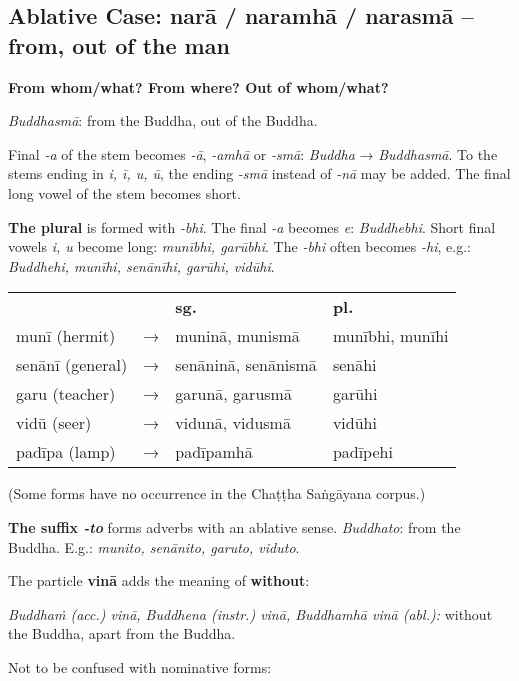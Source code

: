 \documentclass[11pt,oneside]{memoir}
\begin{document}
\normalArrayStrech

\clearpage

\subsection{Ablative Case: narā / naramhā / narasmā -- from, out of the man}
\label{sec:orgd379838}

\textbf{From whom/what? From where? Out of whom/what?}

\emph{Buddhasmā}: from the Buddha, out of the Buddha.

Final \emph{-a} of the stem becomes \emph{-ā}, \emph{-amhā} or \emph{-smā}: \emph{Buddha} → \emph{Buddhasmā}.
To the stems ending in \emph{i, ī, u, ū}, the ending \emph{-smā} instead of \emph{-nā} may be
added. The final long vowel of the stem becomes short.

\textbf{The plural} is formed with \emph{-bhi}. The final \emph{-a} becomes \emph{e}: \emph{Buddhebhi}.
Short final vowels \emph{i, u} become long: \emph{munībhi, garūbhi}. The \emph{-bhi} often
becomes \emph{-hi}, e.g.: \emph{Buddhehi, munīhi, senānīhi, garūhi, vidūhi}.

\begin{center}
\begin{tabular}{llll}
 &  & \textbf{sg.} & \textbf{pl.}\\[0pt]
munī (hermit) & → & muninā, munismā & munībhi, munīhi\\[0pt]
senānī (general) & → & senāninā, senānismā & senāhi\\[0pt]
garu (teacher) & → & garunā,  garusmā & garūhi\\[0pt]
vidū (seer) & → & vidunā, vidusmā & vidūhi\\[0pt]
padīpa (lamp) & → & padīpamhā & padīpehi\\[0pt]
\end{tabular}
\end{center}

(Some forms have no occurrence in the Chaṭṭha Saṅgāyana corpus.)

\textbf{The suffix \emph{-to}} forms adverbs with an ablative sense. \emph{Buddhato}: from the Buddha. E.g.: \emph{munito, senānito, garuto, viduto}.

The particle \textbf{vinā} adds the meaning of \textbf{without}:

\emph{Buddhaṁ (acc.) vinā, Buddhena (instr.) vinā, Buddhamhā vinā (abl.):} without
the Buddha, apart from the Buddha.

Not to be confused with nominative forms:
\end{document}
